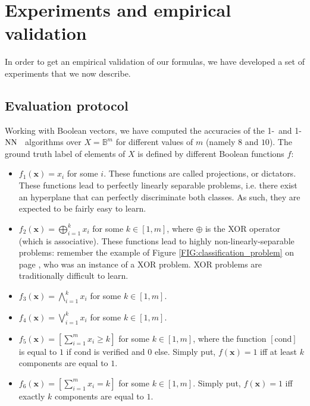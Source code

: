 \section{Experiments and empirical validation}
\label{SEC:experiments_and_empirical_validation}
In order to get an empirical validation of our formulas, we have developed a
set of experiments that we now describe.

\subsection{Evaluation protocol}

Working with Boolean vectors, we have
computed the accuracies of the 1-\NAN~and 1-$\text{NN}$~ algorithms over
$X=\mathbb{B}^m$ for different values of $m$ (namely $8$ and $10$). The ground
truth label of elements of $X$ is defined by different Boolean functions $f$:
\begin{itemize}
\item $f_1(\mathbf{x})=x_i$ for some $i$. These functions are called
  projections, or dictators.  These functions lead to perfectly linearly
    separable problems, i.e.  there exist an hyperplane that can perfectly
    discriminate both classes. As such, they are expected to be fairly easy to
    learn.
  \item $f_2(\mathbf{x})= \bigoplus_{i = 1}^k  x_i$ for some $k \in[1, m]$, where $\oplus$
    is the XOR operator (which is associative). These functions
    lead to highly non-linearly-separable problems: remember the example of
    Figure \ref{FIG:classification_problem} on page
    \pageref{FIG:classification_problem}, who was an instance of a XOR problem.
    XOR problems are traditionally difficult to learn.
  \item $f_3(\mathbf{x})= \bigwedge_{i = 1}^k  x_i$ for some $k \in [1, m]$.
  \item $f_4(\mathbf{x})= \bigvee_{i = 1}^k  x_i$ for some $k\in [1, m]$.
  \item $f_5(\mathbf{x}) = \left[\sum_{i = 1}^m x_i \geq k\right]$ for some $k
    \in [1, m]$, where the function $[\text{cond}]$ is equal to $1$ if cond is
    verified and $0$ else. Simply put, $f(\mathbf{x}) = 1$ iff at least $k$
    components are equal to $1$.
  \item $f_6(\mathbf{x}) = \left[\sum_{i = 1}^m x_i = k\right]$ for some $k
    \in [1, m]$. Simply put, $f(\mathbf{x}) = 1$ iff exactly $k$ components
    are equal to $1$.
\end{itemize}


